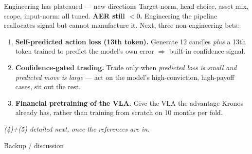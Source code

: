 \documentclass[10pt,aspectratio=169]{beamer}
\begin{document}
\begin{frame}{Engineering has plateaued --- new directions}
\footnotesize
Target-norm, head choice, asset mix, scope, input-norm: all tuned. \textbf{AER still $<0$.}
Engineering the pipeline reallocates signal but cannot manufacture it. Next, three
non-engineering bets:
\\[0.8em]
\begin{enumerate}\itemsep4pt
\item \textbf{Self-predicted action loss (13th token).} Generate 12 candles \emph{plus} a 13th
token trained to predict the model's own error $\Rightarrow$ built-in confidence signal.
\item \textbf{Confidence-gated trading.} Trade only when \emph{predicted loss is small and predicted
move is large} --- act on the model's high-conviction, high-payoff cases, sit out the rest.
\item \textbf{Financial pretraining of the VLA.} Give the VLA the advantage Kronos already has,
rather than training from scratch on 10 months per fold.
\end{enumerate}
\vspace{0.6em}
\centering\textit{(4)+(5) detailed next, once the references are in.}
\end{frame}

\begin{frame}
\centering
\Large Backup / discussion
\end{frame}
\end{document}
